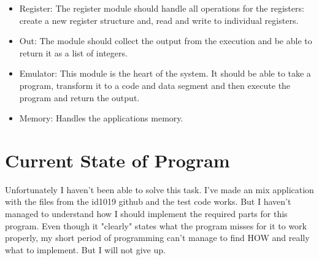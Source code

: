 \documentclass[a4paper,11pt]{article}
\begin{document}
\begin{itemize}
\item Register: The register module should handle all operations for the
		registers: create a new register structure and, read and write to individual registers.
\end{itemize}


\begin{itemize}
\item Out: The module should collect the output from the execution and
		be able to return it as a list of integers.
\end{itemize}


\begin{itemize}
\item Emulator: This module is the heart of the system. It should be able
        to take a program, transform it to a code and data segment and then
        execute the program and return the output.
\end{itemize}


\begin{itemize}
\item Memory: Handles the applications memory.
\end{itemize}

\section{Current State of Program}

Unfortunately I haven't been able to solve this task. I've made an mix application with the files from the id1019 github and the test code works. But I haven't managed to understand how I should implement the required parts for this program. Even though it "clearly" states what the program misses for it to work properly, my short period of programming can't manage to find HOW and really what to implement. But I will not give up.
\end{document}
